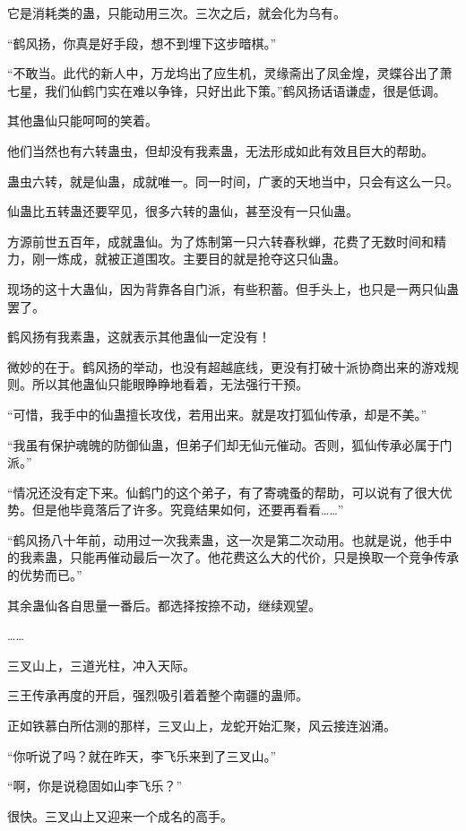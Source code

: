 \begin{this_body}
它是消耗类的蛊，只能动用三次。三次之后，就会化为乌有。

“鹤风扬，你真是好手段，想不到埋下这步暗棋。”

“不敢当。此代的新人中，万龙坞出了应生机，灵缘斋出了凤金煌，灵蝶谷出了萧七星，我们仙鹤门实在难以争锋，只好出此下策。”鹤风扬话语谦虚，很是低调。

其他蛊仙只能呵呵的笑着。

他们当然也有六转蛊虫，但却没有我素蛊，无法形成如此有效且巨大的帮助。

蛊虫六转，就是仙蛊，成就唯一。同一时间，广袤的天地当中，只会有这么一只。

仙蛊比五转蛊还要罕见，很多六转的蛊仙，甚至没有一只仙蛊。

方源前世五百年，成就蛊仙。为了炼制第一只六转春秋蝉，花费了无数时间和精力，刚一炼成，就被正道围攻。主要目的就是抢夺这只仙蛊。

现场的这十大蛊仙，因为背靠各自门派，有些积蓄。但手头上，也只是一两只仙蛊罢了。

鹤风扬有我素蛊，这就表示其他蛊仙一定没有！

微妙的在于。鹤风扬的举动，也没有超越底线，更没有打破十派协商出来的游戏规则。所以其他蛊仙只能眼睁睁地看着，无法强行干预。

“可惜，我手中的仙蛊擅长攻伐，若用出来。就是攻打狐仙传承，却是不美。”

“我虽有保护魂魄的防御仙蛊，但弟子们却无仙元催动。否则，狐仙传承必属于门派。”

“情况还没有定下来。仙鹤门的这个弟子，有了寄魂蚤的帮助，可以说有了很大优势。但是他毕竟落后了许多。究竟结果如何，还要再看看……”

“鹤风扬八十年前，动用过一次我素蛊，这一次是第二次动用。也就是说，他手中的我素蛊，只能再催动最后一次了。他花费这么大的代价，只是换取一个竞争传承的优势而已。”

其余蛊仙各自思量一番后。都选择按捺不动，继续观望。

……

三叉山上，三道光柱，冲入天际。

三王传承再度的开启，强烈吸引着着整个南疆的蛊师。

正如铁慕白所估测的那样，三叉山上，龙蛇开始汇聚，风云接连汹涌。

“你听说了吗？就在昨天，李飞乐来到了三叉山。”

“啊，你是说稳固如山李飞乐？”

很快。三叉山上又迎来一个成名的高手。


\end{this_body}

